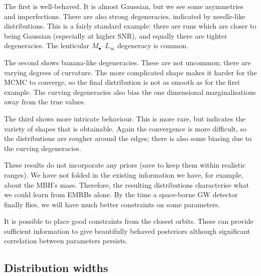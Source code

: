 \documentclass[useAMS,usedcolumn,usegraphicx,usenatbib]{mn2e}
\begin{document}
The first is well-behaved. It is almost Gaussian, but we see some asymmetries and imperfections. There are also strong degeneracies, indicated by needle-like distributions. This is a fairly standard example: there are runs which are closer to being Gaussian (especially at higher SNR), and equally there are tighter degeneracies. The lenticular $M_\bullet$--$L_\infty$ degeneracy is common.

The second shows banana-like degeneracies. These are not uncommon; there are varying degrees of curvature. The more complicated shape makes it harder for the MCMC to converge, so the final distribution is not as smooth as for the first example. The curving degeneracies also bias the one dimensional marginalisations away from the true values.

The third shows more intricate behaviour. This is more rare, but indicates the variety of shapes that is obtainable. Again the convergence is more difficult, so the distributions are rougher around the edges; there is also some biasing due to the curving degeneracies.

These results do not incorporate any priors (save to keep them within realistic ranges). We have not folded in the existing information we have, for example, about the MBH's mass. Therefore, the resulting distributions characterise what we could learn from EMRBs alone. By the time a space-borne GW detector finally flies, we will have much better constraints on some parameters.

It is possible to place good constraints from the closest orbits. These can provide sufficient information to give beautifully behaved posteriors although significant correlation between parameters persists.

\subsection{Distribution widths}
\end{document}
